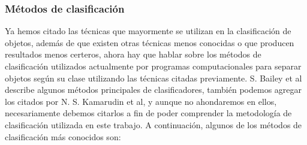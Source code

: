\documentclass[a4paper,12pt,oneside,spanish]{book}
\begin{document}
\subsubsection{Métodos de clasificación}
Ya hemos citado las técnicas que mayormente se utilizan en la clasificación de objetos, además de que existen otras técnicas menos conocidas o que producen resultados menos certeros, ahora hay que hablar sobre los métodos de clasificación utilizados actualmente por programas computacionales para separar objetos según su clase utilizando las técnicas citadas previamente.
S. Bailey et al \cite{bailey} describe algunos métodos principales de clasificadores, también podemos agregar los citados por N. S. Kamarudin et al\cite{kamarudin}, y aunque no ahondaremos en ellos, necesariamente debemos citarlos a fin de poder comprender la metodología de clasificación utilizada en este trabajo. A continuación, algunos de los métodos de clasificación más conocidos son:
\end{document}

